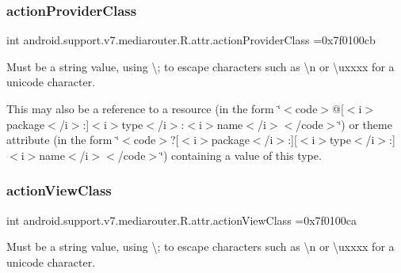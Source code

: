 \subsubsection{\texorpdfstring{action\+Provider\+Class}{actionProviderClass}}
{\footnotesize\ttfamily int android.\+support.\+v7.\+mediarouter.\+R.\+attr.\+action\+Provider\+Class =0x7f0100cb\hspace{0.3cm}{\ttfamily [static]}}

Must be a string value, using \textquotesingle{}\textbackslash{};\textquotesingle{} to escape characters such as \textquotesingle{}\textbackslash{}n\textquotesingle{} or \textquotesingle{}\textbackslash{}uxxxx\textquotesingle{} for a unicode character. 

This may also be a reference to a resource (in the form \char`\"{}$<$code$>$@\mbox{[}$<$i$>$package$<$/i$>$\+:\mbox{]}$<$i$>$type$<$/i$>$\+:$<$i$>$name$<$/i$>$$<$/code$>$\char`\"{}) or theme attribute (in the form \char`\"{}$<$code$>$?\mbox{[}$<$i$>$package$<$/i$>$\+:\mbox{]}\mbox{[}$<$i$>$type$<$/i$>$\+:\mbox{]}$<$i$>$name$<$/i$>$$<$/code$>$\char`\"{}) containing a value of this type. \mbox{\label{classandroid_1_1support_1_1v7_1_1mediarouter_1_1R_1_1attr_af8eed0b01f027fc67250ad2531e80b95}} 
\subsubsection{\texorpdfstring{action\+View\+Class}{actionViewClass}}
{\footnotesize\ttfamily int android.\+support.\+v7.\+mediarouter.\+R.\+attr.\+action\+View\+Class =0x7f0100ca\hspace{0.3cm}{\ttfamily [static]}}

Must be a string value, using \textquotesingle{}\textbackslash{};\textquotesingle{} to escape characters such as \textquotesingle{}\textbackslash{}n\textquotesingle{} or \textquotesingle{}\textbackslash{}uxxxx\textquotesingle{} for a unicode character. 

